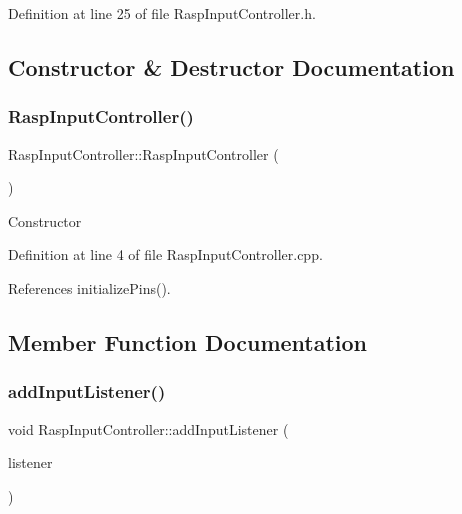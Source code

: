 Definition at line 25 of file Rasp\+Input\+Controller.\+h.



\subsection{Constructor \& Destructor Documentation}
\mbox{\label{class_rasp_input_controller_a63a9e2ab7d0eb5aed2da6068454caa65}} 
\subsubsection{\texorpdfstring{Rasp\+Input\+Controller()}{RaspInputController()}}
{\footnotesize\ttfamily Rasp\+Input\+Controller\+::\+Rasp\+Input\+Controller (\begin{DoxyParamCaption}{ }\end{DoxyParamCaption})}

Constructor 

Definition at line 4 of file Rasp\+Input\+Controller.\+cpp.



References initialize\+Pins().



\subsection{Member Function Documentation}
\mbox{\label{class_rasp_input_controller_a31d6f6befaea44931f0010175bfe1a17}} 
\subsubsection{\texorpdfstring{add\+Input\+Listener()}{addInputListener()}}
{\footnotesize\ttfamily void Rasp\+Input\+Controller\+::add\+Input\+Listener (\begin{DoxyParamCaption}\item[{\hyperlink{class_input_listener}{Input\+Listener} \&}]{listener }\end{DoxyParamCaption})}

